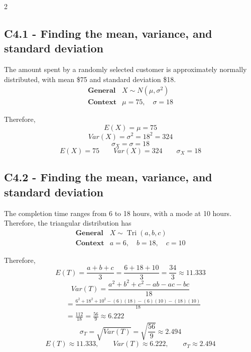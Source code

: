 \begin{multicols}{2}
	
	\subsection*{C4.1 - Finding the mean, variance, and standard deviation}
	\label{subsec:c4-solution-customer-spending}
	
	The amount spent by a randomly selected customer is approximately
	normally distributed, with mean \$75 and standard deviation \$18.
	\[
	\begin{array}{c|c}
		\textbf{General}
		&
		X\sim N(\mu,\sigma^2)
		\\[6pt]
		\textbf{Context}
		&
		\mu=75,\quad \sigma=18
	\end{array}
	\]
	
	Therefore,
	\[
	E(X)
	=
	\mu
	=
	75
	\]
	\[
	Var(X)
	=
	\sigma^2
	=
	18^2
	=
	324
	\]
	\[
	\sigma_X
	=
	\sigma
	=
	18
	\]
	\[
	\boxed{
		E(X)=75\qquad
		Var(X)=324\qquad
		\sigma_X=18
	}
	\]
	
	
	\subsection*{C4.2 - Finding the mean, variance, and standard deviation}
	\label{subsec:c4-solution-repair-time}
	
	The completion time ranges from 6 to 18 hours, with a mode at
	10 hours. Therefore, the triangular distribution has
	\[
	\begin{array}{c|c}
		\textbf{General}
		&
		X\sim\operatorname{Tri}(a,b,c)
		\\[6pt]
		\textbf{Context}
		&
		a=6,\quad b=18,\quad c=10
	\end{array}
	\]
	
	Therefore,
	\[
	E(T)
	=
	\frac{a+b+c}{3}
	=
	\frac{6+18+10}{3}
	=
	\frac{34}{3}
	\approx11.333
	\]
	\[
	Var(T)
	=
	\frac{a^2+b^2+c^2-ab-ac-bc}{18}
	\]
	\[
	\begin{aligned}
		&=
		\frac{
			6^2+18^2+10^2-(6)(18)-(6)(10)-(18)(10)
		}{18} \\[2pt]
		&=
		\frac{112}{18}
		=
		\frac{56}{9}
		\approx 6.222
	\end{aligned}
	\]
	\[
	\sigma_T
	=
	\sqrt{Var(T)}
	=
	\sqrt{\frac{56}{9}}
	\approx2.494
	\]
	\[
	\boxed{
		E(T)\approx11.333,\qquad
		Var(T)\approx6.222,\qquad
		\sigma_T\approx2.494
	}
	\]
	

\end{multicols}
